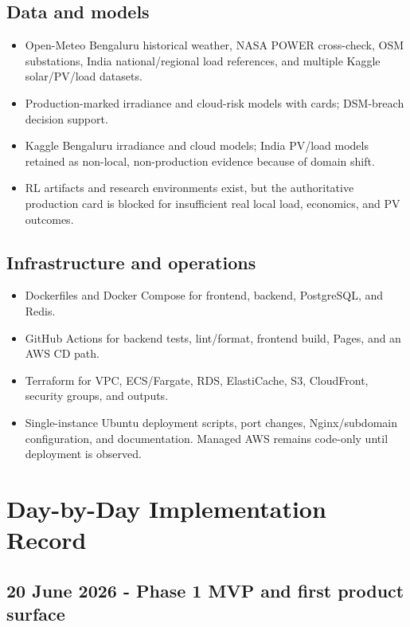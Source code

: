 \documentclass[10pt,a4paper]{article}
\begin{document}
\subsection{Data and models}

\begin{itemize}
  \item Open-Meteo Bengaluru historical weather, NASA POWER cross-check, OSM substations, India
        national/regional load references, and multiple Kaggle solar/PV/load datasets.
  \item Production-marked irradiance and cloud-risk models with cards; DSM-breach decision support.
  \item Kaggle Bengaluru irradiance and cloud models; India PV/load models retained as non-local,
        non-production evidence because of domain shift.
  \item RL artifacts and research environments exist, but the authoritative production card is
        blocked for insufficient real local load, economics, and PV outcomes.
\end{itemize}

\subsection{Infrastructure and operations}

\begin{itemize}
  \item Dockerfiles and Docker Compose for frontend, backend, PostgreSQL, and Redis.
  \item GitHub Actions for backend tests, lint/format, frontend build, Pages, and an AWS CD path.
  \item Terraform for VPC, ECS/Fargate, RDS, ElastiCache, S3, CloudFront, security groups, and outputs.
  \item Single-instance Ubuntu deployment scripts, port changes, Nginx/subdomain configuration, and
        documentation. Managed AWS remains code-only until deployment is observed.
\end{itemize}

\section{Day-by-Day Implementation Record}

\subsection{20 June 2026 - Phase 1 MVP and first product surface}
\end{document}
